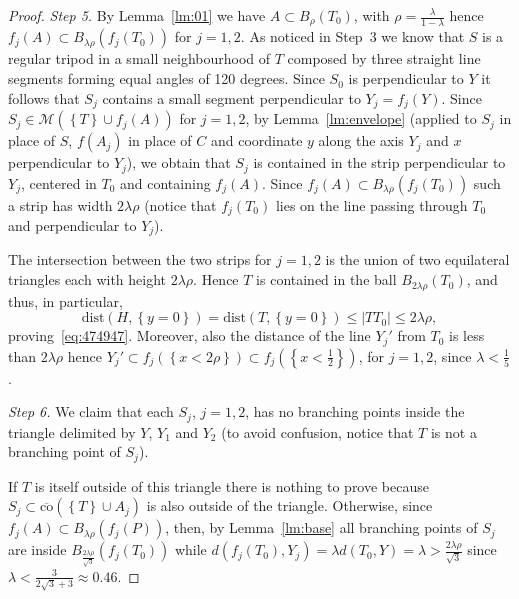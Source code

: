 \documentclass{amsart}
\newcommand{\abs}[1]{\left\vert #1 \right\vert}
\newcommand{\ENCLOSE}[1]{\left\{#1\right\}}
\newcommand{\M}{\mathcal{M}}
\newcommand{\dist}{\mathrm{dist}}
\newcommand{\co}{\mathrm{co}}
\theoremstyle{definition}
\theoremstyle{remark}
\begin{document}
\begin{proof}
  \emph{Step 5.}
  By Lemma~\ref{lm:01} we have $A\subset B_\rho(T_0)$,
  with $\rho=\frac{\lambda}{1-\lambda}$
  hence $f_j(A) \subset B_{\lambda\rho}(f_j(T_0))$
  for $j=1,2$.
  As noticed in Step~3 we know that $S$ is a regular tripod in a small 
  neighbourhood of $T$ composed by three straight line segments forming 
  equal angles of 120 degrees. Since $S_0$ is perpendicular to $Y$ 
  it follows that $S_j$ contains a small segment perpendicular to $Y_j=f_j(Y)$.
  Since $S_j\in \M(\ENCLOSE{T}\cup f_j(A))$ for $j=1,2$,
  by Lemma~\ref{lm:envelope} (applied to $S_j$ in place of $S$, 
  $f(A_j)$ in place of $C$ and coordinate $y$ along the axis $Y_j$ 
  and $x$ perpendicular to $Y_j$),
  we obtain that $S_j$ is contained in the strip perpendicular 
  to $Y_j$, centered in $T_0$ and containing $f_j(A)$. 
  Since $f_j(A)\subset B_{\lambda\rho}(f_j(T_0))$
  such a strip has width $2\lambda\rho$
  (notice that $f_j(T_0)$ lies on the line passing through $T_0$ and perpendicular 
  to $Y_j$).
  
  The intersection between the two strips for $j=1,2$ 
  is the union of two equilateral 
  triangles each with height $2\lambda\rho$. 
  Hence $T$ is contained in the ball
  $B_{2\lambda\rho}(T_0)$, 
  and thus, in particular, 
  \[
    \dist(H,\ENCLOSE{y=0})= \dist(T,\ENCLOSE{y=0})\le \abs{TT_0} \le 2\lambda\rho,
  \]
  proving~\eqref{eq:474947}.
  Moreover, also the distance of the line $Y_j'$ from $T_0$ is less than 
  $2\lambda\rho$ hence $Y_j'\subset f_j(\ENCLOSE{x<2\rho})
  \subset f_j(\ENCLOSE{x<\frac 1 2})$, for $j=1,2$, since $\lambda < \frac 1 5$.
  
  \emph{Step 6.}
  We claim that each $S_j$, $j=1,2$, has no branching points inside the triangle 
  delimited by $Y$, $Y_1$ and $Y_2$ 
  (to avoid confusion, notice that $T$ is not a branching point of $S_j$).
 
  If $T$ is itself outside of this triangle there is nothing to prove
  because $S_j\subset \overline{\co}(\ENCLOSE{T}\cup A_j)$ 
  is also outside of the triangle.
  Otherwise, 
  since $f_j(A)\subset B_{\lambda\rho}(f_j(P))$,
  then, by Lemma~\ref{lm:base} all branching points of $S_j$ 
  are inside $B_{\frac{2\lambda \rho}{\sqrt 3}}(f_j(T_0))$ while 
  $d(f_j(T_0),Y_j)=\lambda d(T_0,Y)
  = \lambda > \frac{2\lambda \rho}{\sqrt 3}$
  since $\lambda < \frac{3}{2\sqrt 3+3}\approx 0.46$.


\end{proof}
\end{document}
